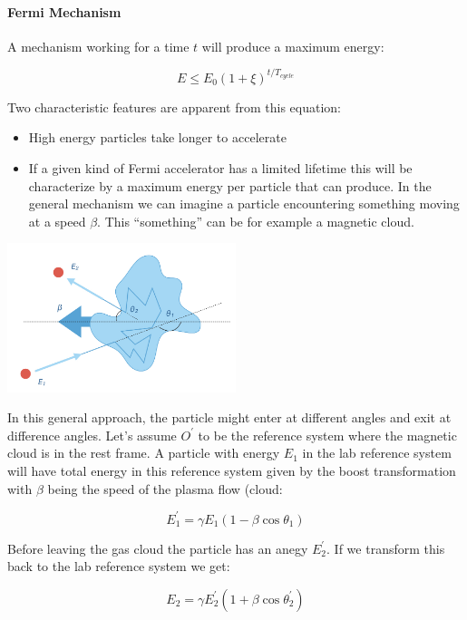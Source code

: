 \documentclass[
  letterpaper,
  DIV=11,
  numbers=noendperiod]{scrreprt}
\let\oldparagraph\paragraph
\renewcommand{\paragraph}[1]{\oldparagraph{#1}\mbox{}}
\providecommand{\tightlist}{%
  \setlength{\itemsep}{0pt}\setlength{\parskip}{0pt}}\usepackage{longtable,booktabs,array}
\begin{document}
\paragraph{Fermi Mechanism}\label{fermi-mechanism}

A mechanism working for a time \(t\) will produce a maximum energy:

\[E\leq E_0 (1+\xi)^{t/T_{cycle}}\]

Two characteristic features are apparent from this equation:

\begin{itemize}
\tightlist
\item
  High energy particles take longer to accelerate
\item
  If a given kind of Fermi accelerator has a limited lifetime this will
  be characterize by a maximum energy per particle that can produce. In
  the general mechanism we can imagine a particle encountering something
  moving at a speed \(\beta\). This ``something'' can be for example a
  magnetic cloud.
\end{itemize}

\begin{center}
\includegraphics[width=0.5\textwidth,height=\textheight]{images/fermi_general.jpeg}
\end{center}

In this general approach, the particle might enter at different angles
and exit at difference angles. Let's assume \(O^\prime\) to be the
reference system where the magnetic cloud is in the rest frame. A
particle with energy \(E_1\) in the lab reference system will have total
energy in this reference system given by the boost transformation with
\(\beta\) being the speed of the plasma flow (cloud:

\[E_1^\prime = \gamma E_1 (1 -\beta \cos\theta_1)\]

Before leaving the gas cloud the particle has an anegy \(E_2^\prime\).
If we transform this back to the lab reference system we get:

\[E_2 = \gamma E_2^\prime (1 +\beta \cos\theta_2^\prime)\]
\end{document}
